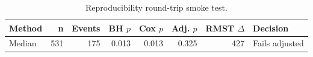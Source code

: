 \begin{table}[t]
\centering
\caption{Reproducibility round-trip smoke test.}
\label{tab:reproducibility-roundtrip-smoke}
\begin{tabular}{lrrrrrrl}
\toprule
Method & n & Events & BH $p$ & Cox $p$ & Adj. $p$ & RMST $\Delta$ & Decision \\
\midrule
Median & 531 & 175 & 0.013 & 0.013 & 0.325 & 427 & Fails adjusted \\
\bottomrule
\end{tabular}
\end{table}
